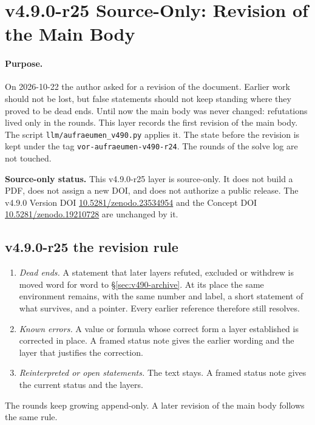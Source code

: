 \clearpage
\section*{v4.9.0-r25 Source-Only: Revision of the Main Body}
\label{sec:v490-r25-main-body-revision}

\paragraph{Purpose.}
On 2026-10-22 the author asked for a revision of the document.  Earlier work should not be lost, but false statements
should not keep standing where they proved to be dead ends.  Until now the main body was never changed: refutations
lived only in the rounds.  This layer records the first revision of the main body.  The script
\texttt{llm/aufraeumen\_v490.py} applies it.  The state before the revision is kept under the tag
\texttt{vor-aufraeumen-v490-r24}.  The rounds of the solve log are not touched.

\noindent\textbf{Source-only status.}
This v4.9.0-r25 layer is source-only.  It does not build a PDF, does not assign a new DOI,
and does not authorize a public release.  The v4.9.0 Version DOI
\href{https://doi.org/10.5281/zenodo.23534954}{10.5281/zenodo.23534954} and the Concept DOI
\href{https://doi.org/10.5281/zenodo.19210728}{10.5281/zenodo.19210728} are unchanged by it.

\subsection*{v4.9.0-r25 the revision rule}
\label{subsec:v490-r25-rule}

\begin{enumerate}[leftmargin=2em]
\item[(A)] \emph{Dead ends.}  A statement that later layers refuted, excluded or withdrew is moved word for word to
\S\ref{sec:v490-archive}.  At its place the same environment remains, with the same number and label, a short statement of
what survives, and a pointer.  Every earlier reference therefore still resolves.
\item[(B)] \emph{Known errors.}  A value or formula whose correct form a layer established is corrected in place.  A framed
status note gives the earlier wording and the layer that justifies the correction.
\item[(C)] \emph{Reinterpreted or open statements.}  The text stays.  A framed status note gives the current status and the
layers.
\end{enumerate}
The rounds keep growing append-only.  A later revision of the main body follows the same rule.


